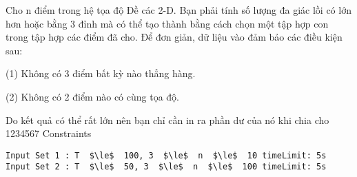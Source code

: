 Cho n điểm trong hệ tọa độ Đề các 2-D. Bạn phải tính số lượng đa giác lồi có lớn hơn hoặc bằng 3 đỉnh mà có thể tạo thành bằng cách chọn một tập hợp con trong tập hợp các điểm đã cho. Để đơn giản, dữ liệu vào đảm bảo các điều kiện sau:  
\begin{itemize}

    (1) Không có 3 điểm bất kỳ nào thẳng hàng.   

    (2) Không có 2 điểm nào có cùng tọa độ.   
\end{itemize}

   Do kết quả có thể rất lớn nên bạn chỉ cần in ra phần dư của nó khi chia cho 1234567
Constraints
\begin{verbatim}
Input Set 1 : T  $\le$  100, 3  $\le$  n  $\le$  10 timeLimit: 5s  
Input Set 2 : T  $\le$  50, 3  $\le$  n  $\le$  100 timeLimit: 5s 
\end{verbatim}